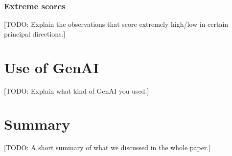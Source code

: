 \documentclass[dtu]{dtuarticle}
\newcommand{\todo}[1]{\color{red}[TODO: #1]\color{black}}
\begin{document}
	\subsubsection{Extreme scores}

	\todo{Explain the observations that score extremely high/low in certain principal directions.}

	\section{Use of GenAI}

	\todo{Explain what kind of GenAI you used.}

	\section*{Summary}

	\todo{A short summary of what we discussed in the whole paper.}

	
	
\end{document}
